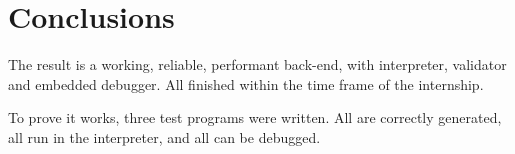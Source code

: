 \section{Conclusions}\label{conclusions}
The result is a working, reliable, performant back-end, with interpreter, validator and embedded debugger.
All finished within the time frame of the internship.

To prove it works, three test programs were written.
All are correctly generated, all run in the interpreter, and all can be debugged.

